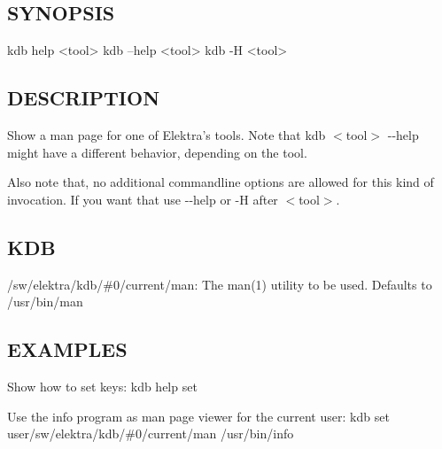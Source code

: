 \subsection*{S\+Y\+N\+O\+P\+S\+IS}

\begin{DoxyVerb}kdb help <tool>
kdb --help <tool>
kdb -H <tool>
\end{DoxyVerb}


\subsection*{D\+E\+S\+C\+R\+I\+P\+T\+I\+ON}

Show a man page for one of Elektra’s tools. Note that {\ttfamily kdb $<$tool$>$ -\/-\/help} might have a different behavior, depending on the tool.

Also note that, no additional commandline options are allowed for this kind of invocation. If you want that use {\ttfamily -\/-\/help} or {\ttfamily -\/H} after {\ttfamily $<$tool$>$}.

\subsection*{K\+DB}


\begin{DoxyItemize}
\item {\ttfamily /sw/elektra/kdb/\#0/current/man}\+: The man(1) utility to be used. Defaults to /usr/bin/man
\end{DoxyItemize}

\subsection*{E\+X\+A\+M\+P\+L\+ES}

Show how to set keys\+: {\ttfamily kdb help set}

Use the info program as man page viewer for the current user\+: {\ttfamily kdb set user/sw/elektra/kdb/\#0/current/man /usr/bin/info} 